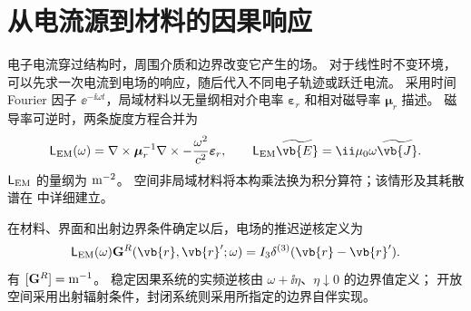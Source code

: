 \section{从电流源到材料的因果响应}\label{sec:feqo-primer-response}

电子电流穿过结构时，周围介质和边界改变它产生的场。
对于线性时不变环境，可以先求一次电流到电场的响应，随后代入不同电子轨迹或跃迁电流。
采用时间 Fourier 因子 $\ee^{-\ii\omega t}$，局域材料以无量纲相对介电率
$\boldsymbol\varepsilon_r$ 和相对磁导率 $\boldsymbol\mu_r$ 描述。
磁导率可逆时，两条旋度方程合并为
\begin{equation}
\mathsf L_{\rm EM}(\omega)=
\nabla\times\boldsymbol\mu_r^{-1}\nabla\times
-\frac{\omega^2}{c^2}\boldsymbol\varepsilon_r,\qquad
\mathsf L_{\rm EM}\widetilde{\vb{E}}=\ii\mu_0\omega\widetilde{\vb{J}}.
\label{eq:feqo-primer-maxwell-operator}
\end{equation}
$\mathsf L_{\rm EM}$ 的量纲为 ${\rm m^{-2}}$。
空间非局域材料将本构乘法换为积分算符；该情形及其耗散谱在
中详细建立。

\begin{definition}
在材料、界面和出射边界条件确定以后，电场的推迟逆核定义为
\begin{equation}
\mathsf L_{\rm EM}(\omega)\mathbf G^R(\vb{r},\vb{r}';\omega)
=I_3\delta^{(3)}(\vb{r}-\vb{r}').
\label{eq:feqo-primer-green}
\end{equation}
有 $[\mathbf G^R]={\rm m^{-1}}$。
稳定因果系统的实频逆核由 $\omega+\ii\eta$、$\eta\downarrow0$ 的边界值定义；
开放空间采用出射辐射条件，封闭系统则采用所指定的边界自伴实现。
\end{definition}

